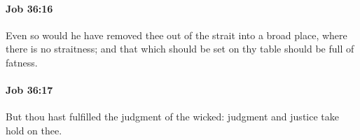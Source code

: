 		\paragraph{Job 36:16} %
			\label{JOB-36-16}

			Even so would he have removed thee out of the strait into a broad place, where there is no straitness; and that which should be set on thy table should be full of fatness.


		\paragraph{Job 36:17} %
			\label{JOB-36-17}

			But thou hast fulfilled the judgment of the wicked: judgment and justice take hold on thee.


